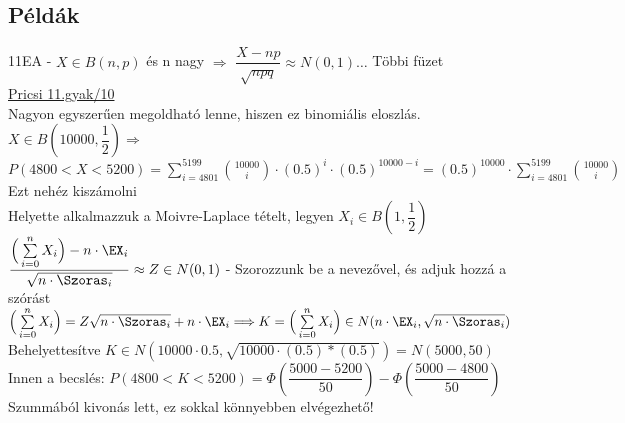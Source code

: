 \subsection{Példák}

	\forceindent 11EA - $X \in B(n,p)$ és n nagy $\Longrightarrow$ $\dfrac{X-np}{\sqrt{npq}} \approx N(0,1) \ldots $ Többi füzet\\[3pt]

	\forceindent \href{http://cs.bme.hu/~pricsi/valszam/valszam11kristof.pdf}{Pricsi 11.gyak/10}\\[-2pt]

	Nagyon egyszerűen megoldható lenne, hiszen ez binomiális eloszlás.\\[2pt] $X \in B(10000,\dfrac{1}{2}) \Rightarrow$  $P(4800 < X < 5200) = \sum\limits_{i=4801}^{5199} {10000 \choose i} \cdot (0.5)^i \cdot (0.5)^{10000-i} = (0.5)^{10000} \cdot \sum\limits_{i=4801}^{5199} {10000 \choose i} $ Ezt nehéz kiszámolni \\[2pt]

	Helyette alkalmazzuk a Moivre-Laplace tételt, legyen $X_i \in B(1,\dfrac{1}{2})$\\[2pt]
	$\dfrac {\Big( \sum\limits_{i=0}^{n} X_i \Big) - n\cdot \EX_i}{ \sqrt{n \cdot \Szoras_i} } \approx Z \in N(0,1)$ - Szorozzunk be a nevezővel, és adjuk hozzá a szórást\\[2pt]
	$\Big( \sum\limits_{i=0}^{n} X_i \Big) = Z \sqrt{n \cdot \Szoras_i}  +  n\cdot \EX_i \Longrightarrow K = \Big( \sum\limits_{i=0}^{n} X_i \Big) \in N(n\cdot \EX_i,\sqrt{n \cdot \Szoras_i})$\\[2pt]
	Behelyettesítve $ K \in N(10000 \cdot 0.5, \sqrt{10000 \cdot (0.5)*(0.5)}) = N(5000,50)$\\[3pt]
	Innen a becslés: $P(4800 < K < 5200) = \Phi(\dfrac{5000-5200}{50} ) - \Phi(\dfrac{5000-4800}{50} )$\\[2pt]
	Szummából kivonás lett, ez sokkal könnyebben elvégezhető!
